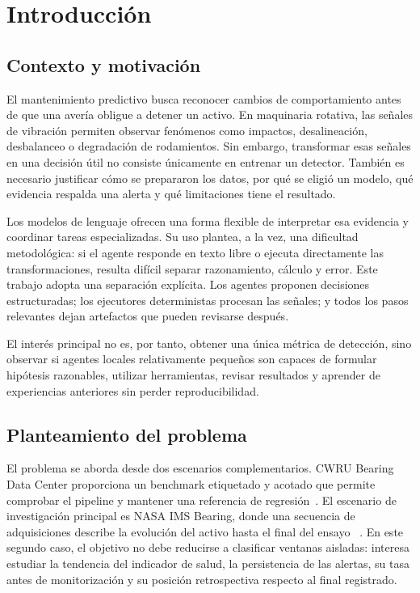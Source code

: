 \chapter{Introducción}

\section{Contexto y motivación}

El mantenimiento predictivo busca reconocer cambios de comportamiento antes de
que una avería obligue a detener un activo. En maquinaria rotativa, las señales
de vibración permiten observar fenómenos como impactos, desalineación,
desbalanceo o degradación de rodamientos. Sin embargo, transformar esas señales
en una decisión útil no consiste únicamente en entrenar un detector. También es
necesario justificar cómo se prepararon los datos, por qué se eligió un modelo,
qué evidencia respalda una alerta y qué limitaciones tiene el resultado.

Los modelos de lenguaje ofrecen una forma flexible de interpretar esa evidencia
y coordinar tareas especializadas. Su uso plantea, a la vez, una dificultad
metodológica: si el agente responde en texto libre o ejecuta directamente las
transformaciones, resulta difícil separar razonamiento, cálculo y error. Este
trabajo adopta una separación explícita. Los agentes proponen decisiones
estructuradas; los ejecutores deterministas procesan las señales; y todos los
pasos relevantes dejan artefactos que pueden revisarse después.

El interés principal no es, por tanto, obtener una única métrica de detección,
sino observar si agentes locales relativamente pequeños son capaces de
formular hipótesis razonables, utilizar herramientas, revisar resultados y
aprender de experiencias anteriores sin perder reproducibilidad.

\section{Planteamiento del problema}

El problema se aborda desde dos escenarios complementarios. CWRU Bearing Data
Center proporciona un benchmark etiquetado y acotado que permite comprobar el
pipeline y mantener una referencia de regresión~\cite{cwru_bearing_data_center}.
El escenario de investigación principal es NASA IMS Bearing, donde una secuencia
de adquisiciones describe la evolución del activo hasta el final del ensayo
~\cite{nasa_pcoe_repository}. En este segundo caso, el objetivo no debe reducirse
a clasificar ventanas aisladas: interesa estudiar la tendencia del indicador de
salud, la persistencia de las alertas, su tasa antes de monitorización y su
posición retrospectiva respecto al final registrado.

